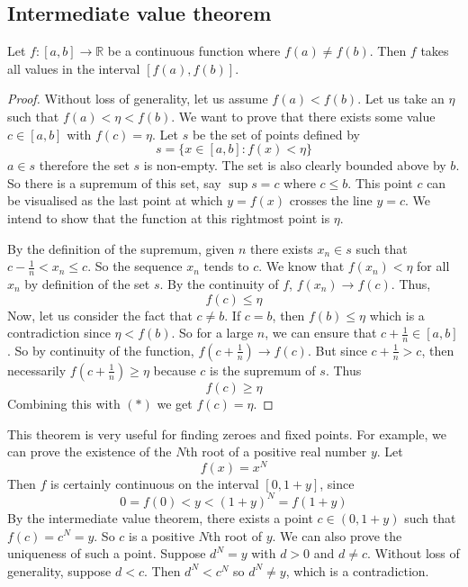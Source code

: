 \subsection{Intermediate value theorem}
\begin{theorem}
	Let \(f \colon [a, b] \to \mathbb R\) be a continuous function where \(f(a) \neq f(b)\).
	Then \(f\) takes all values in the interval \([f(a), f(b)]\).
\end{theorem}
\begin{proof}
	Without loss of generality, let us assume \(f(a) < f(b)\).
	Let us take an \(\eta\) such that \(f(a) < \eta < f(b)\).
	We want to prove that there exists some value \(c \in [a, b]\) with \(f(c) = \eta\).
	Let \(s\) be the set of points defined by
	\[
		s = \{ x \in [a, b] \colon f(x) < \eta \}
	\]
	\(a \in s\) therefore the set \(s\) is non-empty.
	The set is also clearly bounded above by \(b\).
	So there is a supremum of this set, say \(\sup s = c\) where \(c \leq b\).
	This point \(c\) can be visualised as the last point at which \(y=f(x)\) crosses the line \(y=c\).
	We intend to show that the function at this rightmost point is \(\eta\).

	By the definition of the supremum, given \(n\) there exists \(x_n \in s\) such that \(c - \frac{1}{n} < x_n \leq c\).
	So the sequence \(x_n\) tends to \(c\).
	We know that \(f(x_n) < \eta\) for all \(x_n\) by definition of the set \(s\).
	By the continuity of \(f\), \(f(x_n) \to f(c)\).
	Thus,
	\begin{equation}
		f(c) \leq \eta \tag{\(\ast\)}
	\end{equation}
	Now, let us consider the fact that \(c \neq b\).
	If \(c = b\), then \(f(b) \leq \eta\) which is a contradiction since \(\eta < f(b)\).
	So for a large \(n\), we can ensure that \(c + \frac{1}{n} \in [a,b]\).
	So by continuity of the function, \(f(c + \frac{1}{n}) \to f(c)\).
	But since \(c + \frac{1}{n} > c\), then necessarily \(f(c + \frac{1}{n}) \geq \eta\) because \(c\) is the supremum of \(s\).
	Thus
	\[
		f(c) \geq \eta
	\]
	Combining this with \((\ast)\) we get \(f(c) = \eta\).
\end{proof}
\noindent This theorem is very useful for finding zeroes and fixed points.
For example, we can prove the existence of the \(N\)th root of a positive real number \(y\).
Let
\[
	f(x) = x^N
\]
Then \(f\) is certainly continuous on the interval \([0, 1+y]\), since
\[
	0 = f(0) < y < (1+y)^N = f(1 + y)
\]
By the intermediate value theorem, there exists a point \(c \in (0, 1+y)\) such that \(f(c) = c^N = y\).
So \(c\) is a positive \(N\)th root of \(y\).
We can also prove the uniqueness of such a point.
Suppose \(d^N = y\) with \(d>0\) and \(d \neq c\).
Without loss of generality, suppose \(d < c\).
Then \(d^N < c^N\) so \(d^N \neq y\), which is a contradiction.

